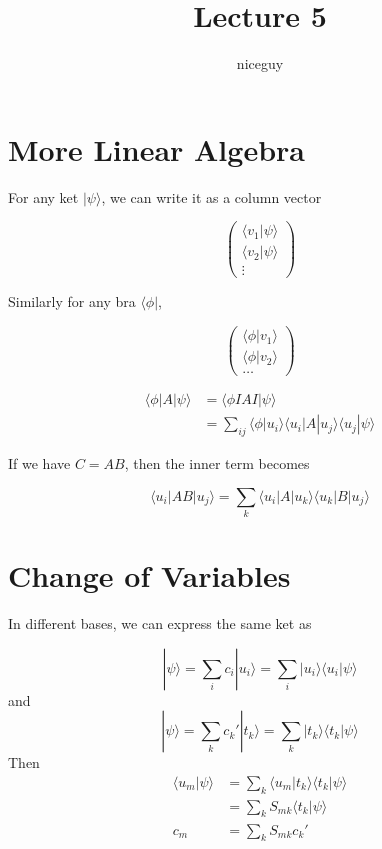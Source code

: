\documentclass[12pt]{article}
\title{Lecture 5}
\author{niceguy}
\begin{document}
\maketitle

\section{More Linear Algebra}

For any ket $|\psi\rangle$, we can write it as a column vector

$$\begin{pmatrix} \langle v_1|\psi\rangle \\ \langle v_2|\psi\rangle \\ \vdots \end{pmatrix}$$

Similarly for any bra $\langle\phi|$,

$$\begin{pmatrix} \langle \phi|v_1\rangle \\ \langle \phi|v_2\rangle \\ \dots \end{pmatrix}$$

\begin{align*}
    \langle \phi | A | \psi \rangle &= \langle \phi IAI | \psi \rangle \\
                                    &= \sum_{ij} \langle \phi | u_i \rangle \langle u_i | A | u_j \rangle \langle u_j | \psi \rangle
\end{align*}

If we have $C=AB$, then the inner term becomes

$$\langle u_i | AB | u_j \rangle = \sum_k \langle u_i | A | u_k \rangle \langle u_k | B | u_j \rangle$$

\section{Change of Variables}

In different bases, we can express the same ket as

$$|\psi\rangle = \sum_i c_i|u_i\rangle = \sum_i |u_i\rangle\langle u_i |\psi \rangle$$
and
$$|\psi\rangle = \sum_k c_k'|t_k\rangle = \sum_k |t_k\rangle\langle t_k |\psi \rangle$$
Then
\begin{align*}
    \langle u_m | \psi \rangle &= \sum_k \langle u_m|t_k \rangle\langle t_k | \psi \rangle \\
                               &= \sum_k S_{mk} \langle t_k|\psi \rangle \\
    c_m &= \sum_k S_{mk}c_k'
\end{align*}
\end{document}
